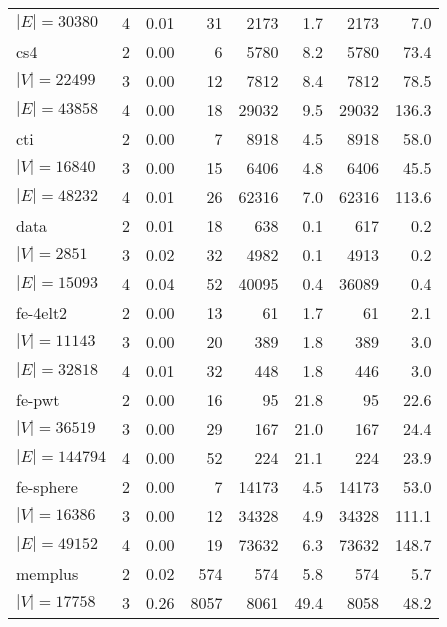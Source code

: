 \documentclass[letterpaper]{article}
\begin{document}
\begin{table}
\begin{tabular}{l c rr rr rr}
\hspace*{0.2em}\color{gray}$|E|{=}30380$& 4&0.01&31&2173&1.7&2173&7.0\\
cs4  & 2&0.00&6&5780&8.2&5780&73.4\\
\hspace*{0.2em}\color{gray}$|V|{=}22499$& 3&0.00&12&7812&8.4&7812&78.5\\
\hspace*{0.2em}\color{gray}$|E|{=}43858$& 4&0.00&18&29032&9.5&29032&136.3\\
cti  & 2&0.00&7&8918&4.5&8918&58.0\\
\hspace*{0.2em}\color{gray}$|V|{=}16840$& 3&0.00&15&6406&4.8&6406&45.5\\
\hspace*{0.2em}\color{gray}$|E|{=}48232$& 4&0.01&26&62316&7.0&62316&113.6\\
data  & 2&0.01&18&638&0.1&617&0.2\\
\hspace*{0.2em}\color{gray}$|V|{=}2851$& 3&0.02&32&4982&0.1&4913&0.2\\
\hspace*{0.2em}\color{gray}$|E|{=}15093$& 4&0.04&52&40095&0.4&36089&0.4\\
fe-4elt2  & 2&0.00&13&61&1.7&61&2.1\\
\hspace*{0.2em}\color{gray}$|V|{=}11143$& 3&0.00&20&389&1.8&389&3.0\\
\hspace*{0.2em}\color{gray}$|E|{=}32818$& 4&0.01&32&448&1.8&446&3.0\\
fe-pwt  & 2&0.00&16&95&21.8&95&22.6\\
\hspace*{0.2em}\color{gray}$|V|{=}36519$& 3&0.00&29&167&21.0&167&24.4\\
\hspace*{0.2em}\color{gray}$|E|{=}144794$& 4&0.00&52&224&21.1&224&23.9\\
fe-sphere  & 2&0.00&7&14173&4.5&14173&53.0\\
\hspace*{0.2em}\color{gray}$|V|{=}16386$& 3&0.00&12&34328&4.9&34328&111.1\\
\hspace*{0.2em}\color{gray}$|E|{=}49152$& 4&0.00&19&73632&6.3&73632&148.7\\
memplus  & 2&0.02&574&574&5.8&574&5.7\\
\hspace*{0.2em}\color{gray}$|V|{=}17758$& 3&0.26&8057&8061&49.4&8058&48.2\\

\end{tabular}
\end{table}
\end{document}
